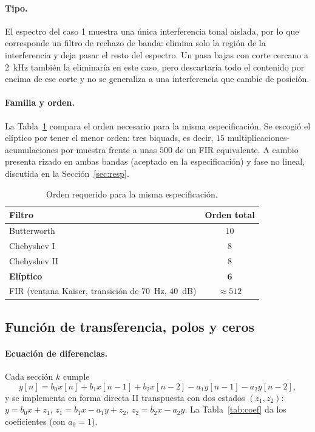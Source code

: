 \paragraph{Tipo.} El espectro del caso 1 muestra una única interferencia tonal aislada, por lo que corresponde un filtro de rechazo de banda: elimina solo la región de la interferencia y deja pasar el resto del espectro. Un pasa bajas con corte cercano a $2$~kHz también la eliminaría en este caso, pero descartaría todo el contenido por encima de ese corte y no se generaliza a una interferencia que cambie de posición.

\paragraph{Familia y orden.} La Tabla~\ref{tab:orden} compara el orden necesario para la misma especificación. Se escogió el elíptico por tener el menor orden: tres biquads, es decir, $15$ multiplicaciones-acumulaciones por muestra frente a unas $500$ de un FIR equivalente. A cambio presenta rizado en ambas bandas (aceptado en la especificación) y fase no lineal, discutida en la Sección~\ref{sec:resp}.

\begin{table}[h]
\centering
\begin{tabular}{|l|c|}
\hline
\textbf{Filtro} & \textbf{Orden total} \\ \hline
Butterworth & $10$ \\ \hline
Chebyshev I & $8$ \\ \hline
Chebyshev II & $8$ \\ \hline
\textbf{Elíptico} & $\mathbf{6}$ \\ \hline
FIR (ventana Kaiser, transición de $70$~Hz, $40$~dB) & $\approx 512$ \\ \hline
\end{tabular}
\caption{Orden requerido para la misma especificación.}
\label{tab:orden}
\end{table}

\subsection{Función de transferencia, polos y ceros}

\paragraph{Ecuación de diferencias.} Cada sección $k$ cumple
\begin{equation}
y[n] = b_0 x[n] + b_1 x[n-1] + b_2 x[n-2] - a_1 y[n-1] - a_2 y[n-2],
\end{equation}
y se implementa en forma directa II transpuesta con dos estados $(z_1, z_2)$:
$y = b_0 x + z_1$, \; $z_1 = b_1 x - a_1 y + z_2$, \; $z_2 = b_2 x - a_2 y$.
La Tabla~\ref{tab:coef} da los coeficientes (con $a_0 = 1$).

